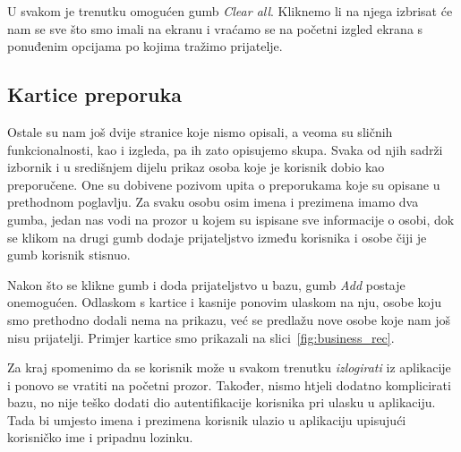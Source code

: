 \documentclass[titlepage, 12pt]{scrartcl}
\begin{document}
	U svakom je trenutku omogućen gumb \emph{Clear all}. Kliknemo li na njega izbrisat će nam se sve što smo imali na ekranu i vraćamo se na početni izgled ekrana s ponuđenim opcijama po kojima tražimo prijatelje.
	
	
	\subsection{Kartice preporuka}
	
	Ostale su nam još dvije stranice koje nismo opisali, a veoma su sličnih funkcionalnosti, kao i izgleda, pa ih zato opisujemo skupa. Svaka od njih sadrži izbornik i u središnjem dijelu prikaz osoba koje je korisnik dobio kao preporučene. One su dobivene pozivom upita o preporukama koje su opisane u prethodnom poglavlju. Za svaku osobu osim imena i prezimena imamo dva gumba, jedan nas vodi na prozor u kojem su ispisane sve informacije o osobi, dok se klikom na drugi gumb dodaje prijateljstvo između korisnika i osobe čiji je gumb korisnik stisnuo.
	
	Nakon što se klikne gumb i doda prijateljstvo u bazu, gumb \emph{Add} postaje onemogućen. Odlaskom s kartice i kasnije ponovim ulaskom na nju, osobe koju smo prethodno dodali nema na prikazu, već se predlažu nove osobe koje nam još nisu prijatelji. Primjer kartice smo prikazali na slici~\ref{fig:business_rec}.
	
	Za kraj spomenimo da se korisnik može u svakom trenutku \emph{izlogirati} iz aplikacije i ponovo se vratiti na početni prozor. Također, nismo htjeli dodatno komplicirati bazu, no nije teško dodati dio autentifikacije korisnika pri ulasku u aplikaciju. Tada bi umjesto imena i prezimena korisnik ulazio u aplikaciju upisujući korisničko ime i pripadnu lozinku. 
	\newpage
\end{document}
